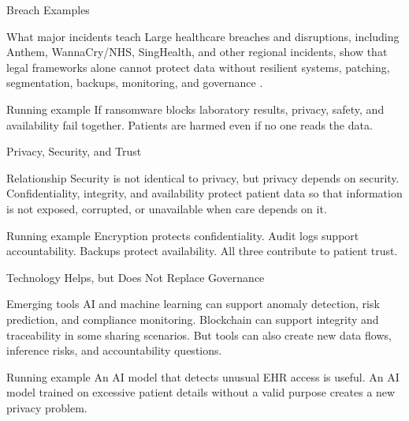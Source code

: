 \documentclass[presentation]{beamer}
\begin{document}
\begin{frame}[c]{Breach Examples}
\begin{block}{What major incidents teach}
Large healthcare breaches and disruptions, including Anthem, WannaCry/NHS, SingHealth, and other
regional incidents, show that legal frameworks alone cannot protect data without resilient systems,
patching, segmentation, backups, monitoring, and governance \cite{conduah2025}.
\end{block}

\begin{exampleblock}{Running example}
If ransomware blocks laboratory results, privacy, safety, and availability fail together. Patients
are harmed even if no one reads the data.
\end{exampleblock}
\end{frame}

\begin{frame}[c]{Privacy, Security, and Trust}
\begin{block}{Relationship}
Security is not identical to privacy, but privacy depends on security. Confidentiality, integrity,
and availability protect patient data so that information is not exposed, corrupted, or unavailable
when care depends on it.
\end{block}

\begin{exampleblock}{Running example}
Encryption protects confidentiality. Audit logs support accountability. Backups protect
availability. All three contribute to patient trust.
\end{exampleblock}
\end{frame}

\begin{frame}[c]{Technology Helps, but Does Not Replace Governance}
\begin{block}{Emerging tools}
AI and machine learning can support anomaly detection, risk prediction, and compliance monitoring.
Blockchain can support integrity and traceability in some sharing scenarios. But tools can also
create new data flows, inference risks, and accountability questions.
\end{block}

\begin{exampleblock}{Running example}
An AI model that detects unusual EHR access is useful. An AI model trained on excessive patient
details without a valid purpose creates a new privacy problem.
\end{exampleblock}
\end{frame}
\end{document}
